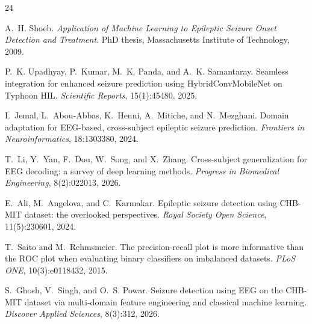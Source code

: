 \documentclass[11pt,a4paper]{article}
\begin{document}
\begin{thebibliography}{24}
\providecommand{\natexlab}[1]{#1}

A.~H. Shoeb.
\newblock \emph{Application of Machine Learning to Epileptic Seizure Onset
  Detection and Treatment}.
\newblock PhD thesis, Massachusetts Institute of Technology, 2009.

P.~K. Upadhyay, P.~Kumar, M.~K. Panda, and A.~K. Samantaray.
\newblock Seamless integration for enhanced seizure prediction using
  HybridConvMobileNet on Typhoon HIL.
\newblock \emph{Scientific Reports}, 15(1):45480, 2025.

I.~Jemal, L.~Abou-Abbas, K.~Henni, A.~Mitiche, and N.~Mezghani.
\newblock Domain adaptation for {EEG}-based, cross-subject epileptic seizure
  prediction.
\newblock \emph{Frontiers in Neuroinformatics}, 18:1303380, 2024.

T.~Li, Y.~Yan, F.~Dou, W.~Song, and X.~Zhang.
\newblock Cross-subject generalization for {EEG} decoding: a survey of deep
  learning methods.
\newblock \emph{Progress in Biomedical Engineering}, 8(2):022013, 2026.

E.~Ali, M.~Angelova, and C.~Karmakar.
\newblock Epileptic seizure detection using {CHB-MIT} dataset: the overlooked
  perspectives.
\newblock \emph{Royal Society Open Science}, 11(5):230601, 2024.

T.~Saito and M.~Rehmsmeier.
\newblock The precision-recall plot is more informative than the {ROC} plot
  when evaluating binary classifiers on imbalanced datasets.
\newblock \emph{PLoS ONE}, 10(3):e0118432, 2015.

S.~Ghosh, V.~Singh, and O.~S. Powar.
\newblock Seizure detection using {EEG} on the {CHB-MIT} dataset via
  multi-domain feature engineering and classical machine learning.
\newblock \emph{Discover Applied Sciences}, 8(3):312, 2026.


\end{thebibliography}
\end{document}

